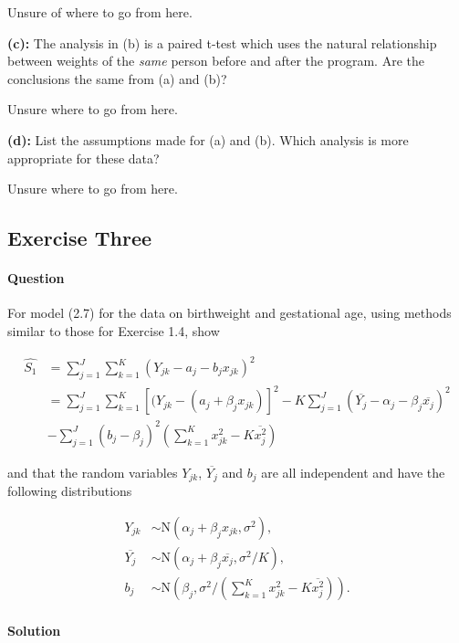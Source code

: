 \documentclass[]{article}
\let\oldparagraph\paragraph
\renewcommand{\paragraph}[1]{\oldparagraph{#1}\mbox{}}
\begin{document}
Unsure of where to go from here.

\textbf{(c):} The analysis in (b) is a paired t-test which uses the
natural relationship between weights of the \emph{same} person before
and after the program. Are the conclusions the same from (a) and (b)?

Unsure where to go from here.

\textbf{(d):} List the assumptions made for (a) and (b). Which analysis
is more appropriate for these data?

Unsure where to go from here.

\pagebreak

\subsection{Exercise Three}\label{exercise-three}

\paragraph{Question}\label{question-2}

For model (2.7) for the data on birthweight and gestational age, using
methods similar to those for Exercise 1.4, show

\begin{align*}
\hat{S_1} &= \sum_{j=1}^J\sum_{k=1}^K(Y_{jk} - a_j - b_jx_{jk})^2\\
&= \sum_{j=1}^J\sum_{k=1}^K[(Y_{jk} - (a_j + \beta_jx_{jk})]^2 - K\sum_{j=1}^J(\overline{Y_j} - \alpha_j - \beta_j\overline{x_j})^2\\
&-\sum_{j=1}^J(b_j - \beta_j)^2(\sum_{k=1}^K x_{jk}^2 - K\overline{x_j^2})
\end{align*}

and that the random variables \(Y_{jk}\), \(\overline{Y_j}\) and \(b_j\)
are all independent and have the following distributions

\begin{align*}
Y_{jk} &\sim \text{N}(\alpha_j + \beta_jx_{jk}, \sigma^2),   \\
\overline{Y_j} &\sim \text{N}(\alpha_j + \beta_j\overline{x_j}, \sigma^2/K),    \\
b_j &\sim \text{N}(\beta_j, \sigma^2/(\sum_{k=1}^K x_{jk}^2 - K\overline{x^2_j})).
\end{align*}

\paragraph{Solution}\label{solution-1}
\end{document}
